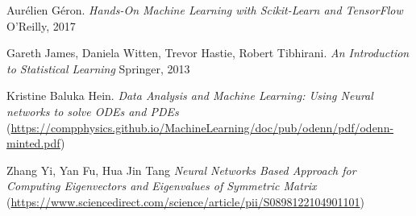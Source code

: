 \documentclass{article}
\begin{document}
\begin{thebibliography}{3}
    Aur\'elien G\'eron.
    \textit{Hands-On Machine Learning with Scikit-Learn and TensorFlow}
    O'Reilly, 2017

    Gareth James, Daniela Witten, Trevor Hastie, Robert Tibhirani.
    \textit{An Introduction to Statistical Learning}
    Springer, 2013

    Kristine Baluka Hein.
    \textit{Data Analysis and Machine Learning: Using Neural networks to solve ODEs and PDEs}
    (\url{https://compphysics.github.io/MachineLearning/doc/pub/odenn/pdf/odenn-minted.pdf})

    Zhang Yi, Yan Fu, Hua Jin Tang
    \textit{Neural Networks Based Approach for Computing Eigenvectors and Eigenvalues of Symmetric Matrix}
    (\url{https://www.sciencedirect.com/science/article/pii/S0898122104901101})
\end{thebibliography}
\end{document}
